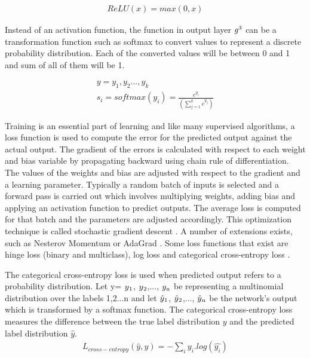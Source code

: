 \documentclass[a4paper, 11pt]{article}
\begin{document}
\begin{align*}
ReLU(x) = max(0,x)
\end{align*}

Instead of an activation function, the function in output layer $g\textsuperscript{3}$ can be a transformation function such as softmax to convert values to represent a discrete probability distribution. Each of the converted values will be between 0 and 1 and sum of all of them will be 1.

\begin{align*}
y = y_1,y_2...,y_k \\
s_i = softmax(y_i) = \frac{e^{y_i}}{(\sum_{j=1}^ke^{y_j})}
\end{align*}

Training is an essential part of learning and like many supervised algorithms, a loss function is used to compute the error for the predicted output against the actual output. The gradient of the errors is calculated with respect to each weight and bias variable by propagating backward using chain rule of differentiation. The values of the weights and bias are adjusted with respect to the gradient and a learning parameter. Typically a random batch of inputs is selected and a forward pass is carried out which involves multiplying weights, adding bias and applying an activation function to predict outputs. The average loss is computed for that batch and the parameters are adjusted accordingly. This optimization technique is called stochastic gradient descent \cite{Bottou2012}. A number of extensions exists, such as Nesterov Momentum \cite{Sutskever2013} or AdaGrad \cite{Duchi2011}. Some loss functions that exist are hinge loss (binary and multiclass), log loss and categorical cross-entropy loss \cite{Goldberg2016}. 


The categorical cross-entropy loss is used when predicted output refers to a probability distribution. Let y= $y\textsubscript{1}$, $y\textsubscript{2}$,..., $y\textsubscript{n}$ be representing a multinomial distribution over the labels 1,2...n and let $\hat{y}\textsubscript{1}$, $\hat{y}\textsubscript{2}$,..., $\hat{y}\textsubscript{n}$ be the network's output which is transformed by a softmax function. The categorical cross-entropy loss measures the difference between the true label distribution $y$ and the predicted label distribution $\hat{y}$. 
\begin{align*}
L_{cross-entropy}(\hat{y},y) = -\sum_iy_i.log(\hat{y_i})
\end{align*}
\end{document}
